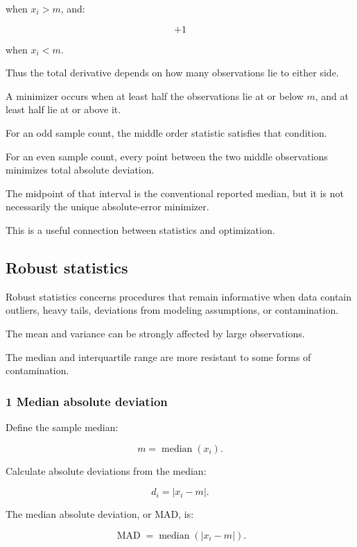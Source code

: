 when \(x_i>m\), and:

\[
 +1
\]

when \(x_i<m\).

Thus the total derivative depends on how many observations lie to either side.

A minimizer occurs when at least half the observations lie at or below \(m\), and at least half lie at or above it.

For an odd sample count, the middle order statistic satisfies that condition.

For an even sample count, every point between the two middle observations minimizes total absolute deviation.

The midpoint of that interval is the conventional reported median, but it is not necessarily the unique absolute-error minimizer.

This is a useful connection between statistics and optimization.

\subsection{Robust statistics}\label{02-foundations-ii-ch030-robust-statistics}

\hypertarget{02-foundations-ii-ch030-robust-statistics}{}

Robust statistics concerns procedures that remain informative when data contain outliers, heavy tails, deviations from modeling assumptions, or contamination.

The mean and variance can be strongly affected by large observations.

The median and interquartile range are more resistant to some forms of contamination.

\subsubsection{1 Median absolute deviation}\label{02-foundations-ii-ch030-median-absolute-deviation}

\hypertarget{02-foundations-ii-ch030-median-absolute-deviation}{}

Define the sample median:

\[
 m=\operatorname{median}(x_i).
\]

Calculate absolute deviations from the median:

\[
 d_i=|x_i-m|.
\]

The median absolute deviation, or MAD, is:

\[
 \boxed{ \operatorname{MAD} = \operatorname{median}(|x_i-m|) }.
\]

